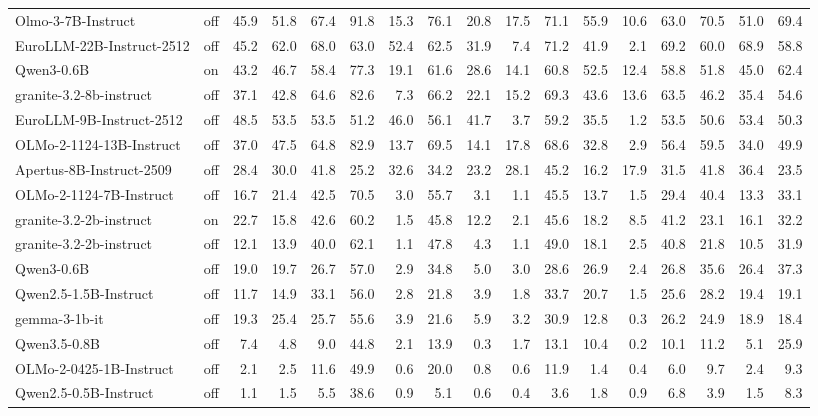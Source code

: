 \begin{table}
{\begin{tabular}{llrrrrrrrrrrrrrrr}
Olmo-3-7B-Instruct & off & 45.9 & 51.8 & 67.4 & 91.8 & 15.3 & 76.1 & 20.8 & 17.5 & 71.1 & 55.9 & 10.6 & 63.0 & 70.5 & 51.0 & 69.4 \\
EuroLLM-22B-Instruct-2512 & off & 45.2 & 62.0 & 68.0 & 63.0 & 52.4 & 62.5 & 31.9 & 7.4 & 71.2 & 41.9 & 2.1 & 69.2 & 60.0 & 68.9 & 58.8 \\
Qwen3-0.6B & on & 43.2 & 46.7 & 58.4 & 77.3 & 19.1 & 61.6 & 28.6 & 14.1 & 60.8 & 52.5 & 12.4 & 58.8 & 51.8 & 45.0 & 62.4 \\
granite-3.2-8b-instruct & off & 37.1 & 42.8 & 64.6 & 82.6 & 7.3 & 66.2 & 22.1 & 15.2 & 69.3 & 43.6 & 13.6 & 63.5 & 46.2 & 35.4 & 54.6 \\
EuroLLM-9B-Instruct-2512 & off & 48.5 & 53.5 & 53.5 & 51.2 & 46.0 & 56.1 & 41.7 & 3.7 & 59.2 & 35.5 & 1.2 & 53.5 & 50.6 & 53.4 & 50.3 \\
OLMo-2-1124-13B-Instruct & off & 37.0 & 47.5 & 64.8 & 82.9 & 13.7 & 69.5 & 14.1 & 17.8 & 68.6 & 32.8 & 2.9 & 56.4 & 59.5 & 34.0 & 49.9 \\
Apertus-8B-Instruct-2509 & off & 28.4 & 30.0 & 41.8 & 25.2 & 32.6 & 34.2 & 23.2 & 28.1 & 45.2 & 16.2 & 17.9 & 31.5 & 41.8 & 36.4 & 23.5 \\
OLMo-2-1124-7B-Instruct & off & 16.7 & 21.4 & 42.5 & 70.5 & 3.0 & 55.7 & 3.1 & 1.1 & 45.5 & 13.7 & 1.5 & 29.4 & 40.4 & 13.3 & 33.1 \\
granite-3.2-2b-instruct & on & 22.7 & 15.8 & 42.6 & 60.2 & 1.5 & 45.8 & 12.2 & 2.1 & 45.6 & 18.2 & 8.5 & 41.2 & 23.1 & 16.1 & 32.2 \\
granite-3.2-2b-instruct & off & 12.1 & 13.9 & 40.0 & 62.1 & 1.1 & 47.8 & 4.3 & 1.1 & 49.0 & 18.1 & 2.5 & 40.8 & 21.8 & 10.5 & 31.9 \\
Qwen3-0.6B & off & 19.0 & 19.7 & 26.7 & 57.0 & 2.9 & 34.8 & 5.0 & 3.0 & 28.6 & 26.9 & 2.4 & 26.8 & 35.6 & 26.4 & 37.3 \\
Qwen2.5-1.5B-Instruct & off & 11.7 & 14.9 & 33.1 & 56.0 & 2.8 & 21.8 & 3.9 & 1.8 & 33.7 & 20.7 & 1.5 & 25.6 & 28.2 & 19.4 & 19.1 \\
gemma-3-1b-it & off & 19.3 & 25.4 & 25.7 & 55.6 & 3.9 & 21.6 & 5.9 & 3.2 & 30.9 & 12.8 & 0.3 & 26.2 & 24.9 & 18.9 & 18.4 \\
Qwen3.5-0.8B & off & 7.4 & 4.8 & 9.0 & 44.8 & 2.1 & 13.9 & 0.3 & 1.7 & 13.1 & 10.4 & 0.2 & 10.1 & 11.2 & 5.1 & 25.9 \\
OLMo-2-0425-1B-Instruct & off & 2.1 & 2.5 & 11.6 & 49.9 & 0.6 & 20.0 & 0.8 & 0.6 & 11.9 & 1.4 & 0.4 & 6.0 & 9.7 & 2.4 & 9.3 \\
Qwen2.5-0.5B-Instruct & off & 1.1 & 1.5 & 5.5 & 38.6 & 0.9 & 5.1 & 0.6 & 0.4 & 3.6 & 1.8 & 0.9 & 6.8 & 3.9 & 1.5 & 8.3 \\

\end{tabular}}
\end{table}
